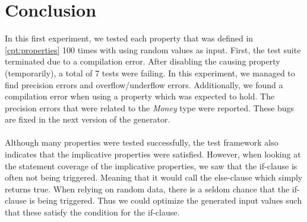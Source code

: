 \section{Conclusion}
In this first experiment, we tested each property that was defined in
\autoref{cpt:properties} 100 times with using random values as input. First, the
test suite terminated due to a compilation error. After disabling the causing
property (temporarily), a total of 7 tests were failing. In this experiment, we
managed to find precision errors and overflow/underflow errors. Additionally, we
found a compilation error when using a property which was expected to hold. The
precision errors that were related to the \textit{Money} type were reported.
These bugs are fixed in the next version of the generator.\\
\\
Although many properties were tested successfully, the test framework also
indicates that the implicative properties were satisfied. However, when looking
at the statement coverage of the implicative properties, we saw that the
if-clause is often not being triggered. Meaning that it would call the else-clause which
simply returns true. When relying on random data, there is a seldom chance that
the if-clause is being triggered. Thus we could optimize the generated input
values such that these satisfy the condition for the if-clause.

